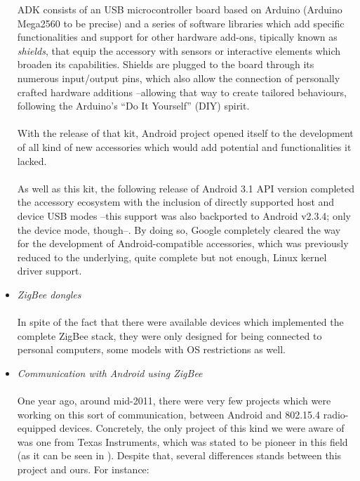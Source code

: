 \begin{itemize}
				ADK consists of an USB microcontroller board based on Arduino (Arduino Mega2560 to be precise) and a
				series of software libraries which add specific functionalities and support for other hardware add-ons,
				tipically known as \emph{shields}, that equip the accessory with sensors or interactive elements
				which broaden its capabilities. Shields are plugged to the board through its numerous input/output
				pins, which also allow the connection of personally crafted hardware additions --allowing that way to
				create tailored behaviours, following the Arduino's ``Do It Yourself'' (DIY) spirit.\\\\
				With the release of that kit, Android project opened itself to the development
				of all kind of new accessories which would add potential and functionalities
				it lacked.\\\\
				As well as this kit, the following release of Android 3.1 API version completed
				the accessory ecosystem with the inclusion of directly supported host and device
				USB modes --this support was also backported to Android v2.3.4; only the device mode, though--.
				By doing so, Google completely cleared the way for the development of Android-compatible accessories, 
				which was previously reduced to the underlying, quite complete but not enough, Linux kernel driver 
				support.\\
			\item \emph{ZigBee dongles}\\\\
				In spite of the fact that there were available devices which implemented the complete ZigBee stack,
				they were only designed for being connected to personal computers, some models with OS 
				restrictions as well.\\
			\item \emph{Communication with Android using ZigBee}\\\\
				One year ago, around mid-2011, there were very few projects which were working on this sort of
				communication, between Android and 802.15.4 radio-equipped devices. Concretely, the only project
				of this kind we were aware of was one from Texas Instruments, which was stated to be pioneer in 
				this field (as it can be seen in \cite{articleTI}).
				Despite that, several differences stands between this project and ours. For instance:
				\begin{itemize}

\end{itemize}
\end{itemize}
